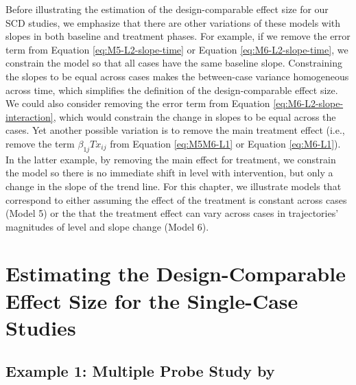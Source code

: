 \documentclass[
]{book}
\begin{document}
Before illustrating the estimation of the design-comparable effect size for our SCD studies, we emphasize that there are other variations of these models with slopes in both baseline and treatment phases. For example, if we remove the error term from Equation \eqref{eq:M5-L2-slope-time} or Equation \eqref{eq:M6-L2-slope-time}, we constrain the model so that all cases have the same baseline slope. Constraining the slopes to be equal across cases makes the between-case variance homogeneous across time, which simplifies the definition of the design-comparable effect size. We could also consider removing the error term from Equation \eqref{eq:M6-L2-slope-interaction}, which would constrain the change in slopes to be equal across the cases. Yet another possible variation is to remove the main treatment effect (i.e., remove the term \(β_{1j}Tx_{ij}\) from Equation \eqref{eq:M5M6-L1} or Equation \eqref{eq:M6-L1}). In the latter example, by removing the main effect for treatment, we constrain the model so there is no immediate shift in level with intervention, but only a change in the slope of the trend line. For this chapter, we illustrate models that correspond to either assuming the effect of the treatment is constant across cases (Model 5) or the that the treatment effect can vary across cases in trajectories' magnitudes of level and slope change (Model 6).

\hypertarget{estimating-the-design-comparable-effect-size-for-the-single-case-studies-2}{%
\section{Estimating the Design-Comparable Effect Size for the Single-Case Studies}\label{estimating-the-design-comparable-effect-size-for-the-single-case-studies-2}}

\hypertarget{example-1-multiple-probe-study-by-datchuk2016writing}{%
\subsection{\texorpdfstring{Example 1: Multiple Probe Study by \citet{datchuk2016Writing}}{Example 1: Multiple Probe Study by @datchuk2016Writing}}\label{example-1-multiple-probe-study-by-datchuk2016writing}}
\end{document}
